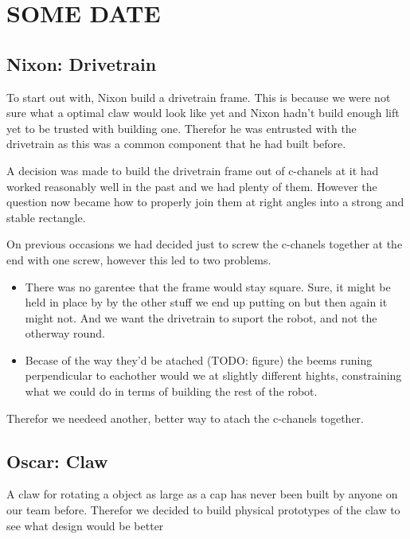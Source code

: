 \documentclass[../../../main.tex]{subfiles}
\begin{document}
\section{SOME DATE}

\subsection{Nixon: Drivetrain}

To start out with, Nixon build a drivetrain frame.
This is because we were not sure what a optimal claw would look like yet and Nixon hadn't build enough lift yet to be trusted with building one.
Therefor he was entrusted with the drivetrain as this was a common component that he had built before.
\par

A decision was made to build the drivetrain frame out of c-chanels at it had worked reasonably well in the past and we had plenty of them.
However the question now became how to properly join them at right angles into a strong and stable rectangle.
\par

On previous occasions we had decided just to screw the c-chanels together at the end with one screw, however this led to two problems.
\par

\begin{itemize}
	\item There was no garentee that the frame would stay square.
	      Sure, it might be held in place by by the other stuff we end up putting on but then again it might not.
	      And we want the drivetrain to suport the robot, and not the otherway round.
	\item Becase of the way they'd be atached (TODO: figure) the beems
	      runing perpendicular to eachother would we at slightly different
	      hights,
	      constraining what we could do in terms of building the rest of
	      the robot.
\end{itemize}

Therefor we needeed another, better way to atach the c-chanels together.

\subsection{Oscar: Claw}

A claw for rotating a object as large as a cap has never been built by anyone on our team before.
Therefor we decided to build physical prototypes of the claw to see what design would be better \par 
\end{document}
